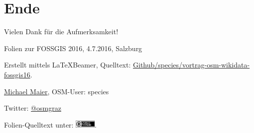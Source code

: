 \documentclass{beamer}
\begin{document}
\section{Ende}

\begin{frame}{Vielen Dank für die Aufmerksamkeit!}

  Folien zur FOSSGIS 2016, 4.7.2016, Salzburg
\vspace{1cm}

Erstellt mittels \LaTeX Beamer, Quelltext: \href{https://github.com/species/vortrag-osm-wikidata-fossgis16}{Github/species/vortrag-osm-wikidata-fossgis16}.
\vspace{1cm}

\href{mailto:michael.maier@mailbox.org}{Michael Maier}, OSM-User: species

Twitter: \href{https://twitter.com/osmgraz}{@osmgraz}
\vspace{1cm}

Folien-Quelltext unter: \includegraphics[width=1cm]{cc-zero.pdf}. 

\end{frame}
\end{document}
